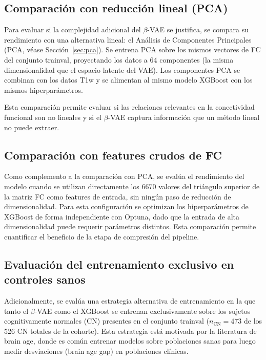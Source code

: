 \subsection{Comparación con reducción lineal (PCA)}
\label{sec:pca_baseline}

Para evaluar si la complejidad adicional del $\beta$-VAE se justifica, se compara su rendimiento con una alternativa lineal: el Análisis de Componentes Principales (PCA, véase Sección~\ref{sec:pca}). Se entrena PCA sobre los mismos vectores de FC del conjunto trainval, proyectando los datos a 64 componentes (la misma dimensionalidad que el espacio latente del VAE). Los componentes PCA se combinan con los datos T1w y se alimentan al mismo modelo XGBoost con los mismos hiperparámetros.

Esta comparación permite evaluar si las relaciones relevantes en la conectividad funcional son no lineales y si el $\beta$-VAE captura información que un método lineal no puede extraer.

\subsection{Comparación con features crudos de FC}
\label{sec:raw_fc_method}

Como complemento a la comparación con PCA, se evalúa el rendimiento del modelo cuando se utilizan directamente los 6670 valores del triángulo superior de la matriz FC como features de entrada, sin ningún paso de reducción de dimensionalidad. Para esta configuración se optimizan los hiperparámetros de XGBoost de forma independiente con Optuna, dado que la entrada de alta dimensionalidad puede requerir parámetros distintos. Esta comparación permite cuantificar el beneficio de la etapa de compresión del pipeline.

\subsection{Evaluación del entrenamiento exclusivo en controles sanos}
\label{sec:cn_only}

Adicionalmente, se evalúa una estrategia alternativa de entrenamiento en la que tanto el $\beta$-VAE como el XGBoost se entrenan exclusivamente sobre los sujetos cognitivamente normales (CN) presentes en el conjunto trainval ($n_{\text{CN}} = 473$ de los 526 CN totales de la cohorte). Esta estrategia está motivada por la literatura de brain age, donde es común entrenar modelos sobre poblaciones sanas para luego medir desviaciones (brain age gap) en poblaciones clínicas.

